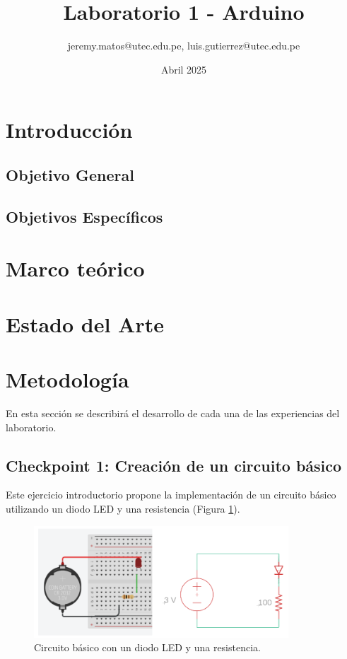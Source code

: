 \documentclass{article}
\title{Laboratorio 1 - Arduino}
\author{jeremy.matos@utec.edu.pe, luis.gutierrez@utec.edu.pe}
\date{Abril 2025}
\begin{document}
\maketitle

\newpage
\tableofcontents
\newpage

\section{Introducción}

\subsection{Objetivo General}

\subsection{Objetivos Específicos}

\newpage

\section{Marco teórico}

\section{Estado del Arte}

\section{Metodología}

En esta sección se describirá el desarrollo de cada una de las experiencias del laboratorio.

\subsection{Checkpoint 1: Creación de un circuito básico}

Este ejercicio introductorio propone la implementación de un circuito básico utilizando un diodo LED y una resistencia (Figura \ref{fig:circuito_basico}). 

\begin{figure}[H]
    \centering
    \includegraphics[width=0.85\textwidth]{./img/ckpt_1_0.png}
    \caption{Circuito básico con un diodo LED y una resistencia.}
    \label{fig:circuito_basico}
\end{figure}
\end{document}
